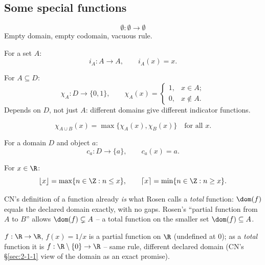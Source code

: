 \subsection{Some special functions}
\label{sec:2-4}
\begin{definition}
\[
\emptyset : \emptyset \to \emptyset
\]
Empty domain, empty codomain, vacuous rule.
\end{definition}

\begin{definition}
For a set $A$:
\[
i_A : A \to A, \qquad i_A(x) = x.
\]
\end{definition}

\begin{definition}
For $A \subseteq D$:
\[
\chi_A : D \to \{0,1\}, \qquad
\chi_A(x) =
\begin{cases}
1, & x \in A; \\
0, & x \notin A.
\end{cases}
\]
Depends on $D$, not just $A$: different domains give different indicator functions.
\end{definition}

\begin{example}
\[
\chi_{A \cup B}(x) = \max\{\chi_A(x), \chi_B(x)\} \quad \text{for all } x.
\]
\end{example}

\begin{definition}
For a domain $D$ and object $a$:
\[
c_a : D \to \{a\}, \qquad c_a(x) = a.
\]
\end{definition}

\begin{definition}
For $x \in \R$:
\[
\lfloor x \rfloor = \max\{n \in \Z : n \le x\}, \qquad
\lceil x \rceil = \min\{n \in \Z : n \ge x\}.
\]
\end{definition}

\begin{note}
CN's definition of a function already \emph{is} what Rosen calls a \emph{total} function: $\dom(f)$ equals the declared domain exactly, with no gaps. Rosen's ``partial function from $A$ to $B$'' allows $\dom(f)\subsetneq A$ -- a total function on the smaller set $\dom(f)\subseteq A$.
\end{note}

\begin{example}
$f:\R\to\R$, $f(x)=1/x$ is a partial function on $\R$ (undefined at $0$); as a \emph{total} function it is $f:\R\setminus\{0\}\to\R$ -- same rule, different declared domain (CN's \S\ref{sec:2-1-1} view of the domain as an exact promise).
\end{example}


